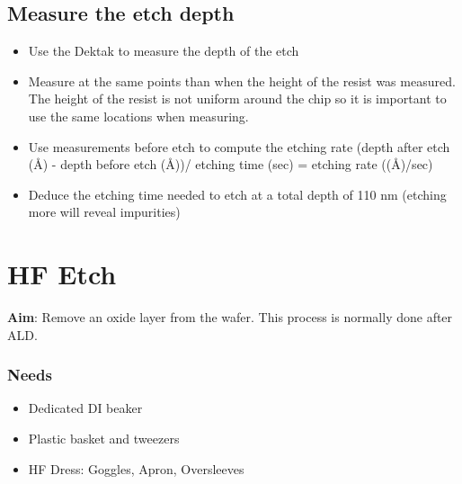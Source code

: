 \subsection{Measure the etch depth}
\begin{itemize}
\item Use the Dektak to measure the depth of the etch
\item Measure at the same points than when the height of the resist was measured. The height of the resist is not uniform around the chip so it
is important to use the same locations when measuring.
\item Use measurements before etch to compute the etching rate (depth after etch (\AA) - depth before etch (\AA))/ etching time (sec) = etching rate ((\AA)/sec)
\item Deduce the etching time needed to etch at a total depth of 110 nm (etching more will reveal impurities)
\end{itemize}
\newpage

\section {HF Etch}
\textbf{Aim}:
Remove an oxide layer from the wafer. This process is normally done after ALD.

\subsubsection{Needs}
\begin{itemize}[noitemsep]
\item Dedicated DI  beaker
\item Plastic basket and tweezers
\item HF Dress: Goggles, Apron, Oversleeves
\end{itemize}

